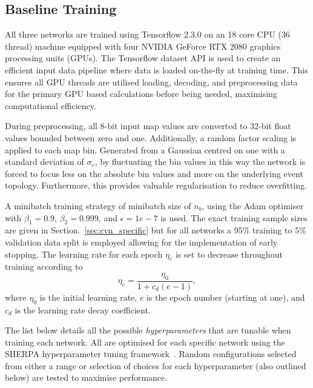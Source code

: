 \subsection{Baseline Training} %
\label{sec:cvn_baseline_training} %

All three networks are trained using Tensorflow 2.3.0 on an 18 core CPU (36 thread) machine
equipped with four NVIDIA GeForce RTX 2080 graphics processing units (GPUs). The Tensorflow
dataset API is used to create an efficient input data pipeline where data is loaded on-the-fly at
training time. This ensures all GPU threads are utilised loading, decoding, and preprocessing data
for the primary GPU based calculations before being needed, maximising computational efficiency.

During preprocessing, all 8-bit input map values are converted to 32-bit float values bounded
between zero and one. Additionally, a random factor scaling is applied to each map bin. Generated
from a Gaussian centred on one with a standard deviation of $\sigma_{r}$, by fluctuating the bin
values in this way the network is forced to focus less on the absolute bin values and more on the
underlying event topology. Furthermore, this provides valuable regularisation to reduce
overfitting.

A minibatch training strategy of minibatch size of $n_{b}$, using the Adam
optimiser~\cite{kingma2014} with $\beta_{1}=0.9$, $\beta_{2}=0.999$, and $\epsilon = 1e-7$ is
used. The exact training sample sizes are given in Section.~\ref{sec:cvn_specific} but for all
networks a 95\% training to 5\% validation data split is employed allowing for the implementation
of early stopping. The learning rate for each epoch $\eta_{e}$ is set to decrease throughout
training according to
\begin{equation}
    \eta_{e}=\frac{\eta_{0}}{1+c_{d}(e-1)},
\end{equation}
where $\eta_{0}$ is the initial learning rate, $e$ is the epoch number (starting at one), and
$c_{d}$ is the learning rate decay coefficient.

The list below details all the possible \emph{hyperparameters} that are tunable when training each
network. All are optimised for each specific network using the SHERPA hyperparameter tuning
framework~\cite{hertel2020}. Random configurations selected from either a range or selection of
choices for each hyperparameter (also outlined below) are tested to maximise performance.

